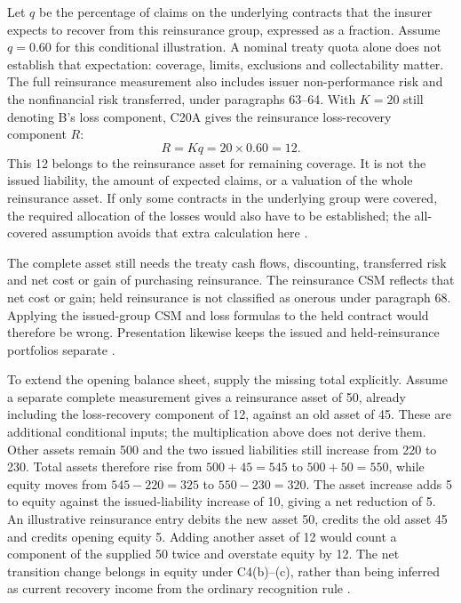 Let $q$ be the percentage of claims on the underlying contracts that the
insurer expects to recover from this reinsurance group, expressed as a
fraction. Assume $q=0.60$ for this conditional illustration. A nominal treaty
quota alone does not establish that expectation: coverage, limits, exclusions
and collectability matter. The full reinsurance measurement also includes
issuer non-performance risk and the nonfinancial risk transferred, under
paragraphs 63--64. With $K=20$ still denoting B's loss component, C20A gives
the reinsurance loss-recovery component $R$:
\[
 R=Kq=20\times 0.60=12.
\]
This 12 belongs to the reinsurance asset for remaining coverage. It is not
the issued liability, the amount of expected claims, or a valuation of the
whole reinsurance asset. If only some contracts in the underlying group were
covered, the required allocation of the losses would also have to be
established; the all-covered assumption avoids that extra calculation here
\citep[paragraphs 63--64, 66B, B119E and C20A]{aasb17}.

The complete asset still needs the treaty cash flows, discounting, transferred
risk and net cost or gain of purchasing reinsurance. The reinsurance CSM
reflects that net cost or gain; held reinsurance is not classified as onerous
under paragraph 68. Applying the issued-group CSM and loss formulas to the
held contract would therefore be wrong. Presentation likewise keeps the
issued and held-reinsurance portfolios separate
\citep[paragraphs 65--68 and 78--79]{aasb17}.

\clearpage
To extend the opening balance sheet, supply the missing total explicitly.
Assume a separate complete measurement gives a reinsurance asset of 50,
already including the loss-recovery component of 12, against an old asset of
45. These are additional conditional inputs; the multiplication above does
not derive them. Other assets remain 500 and the two issued liabilities still
increase from 220 to 230. Total assets therefore rise from $500+45=545$ to
$500+50=550$, while equity moves from $545-220=325$ to $550-230=320$.
The asset increase adds 5 to equity against the issued-liability increase
of 10, giving a net reduction of 5. An illustrative reinsurance entry debits
the new asset 50, credits the old asset 45 and credits opening equity 5.
Adding another asset of 12 would count a component of the supplied 50 twice
and overstate equity by 12. The net transition change belongs in equity
under C4(b)--(c), rather than being inferred as current recovery income
from the ordinary recognition rule \citep[paragraphs C4--C5 and C20A]{aasb17}.

